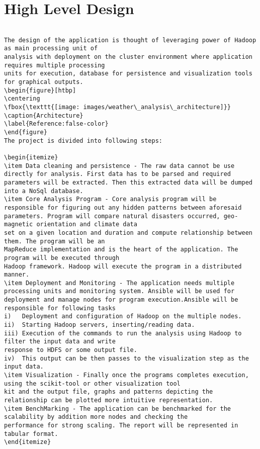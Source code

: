 \documentclass[9pt,twocolumn,twoside]{../../styles/osajnl}
\begin{document}
\section{High Level Design}

\begin{verbatim}

The design of the application is thought of leveraging power of Hadoop as main processing unit of
analysis with deployment on the cluster environment where application requires multiple processing
units for execution, database for persistence and visualization tools for graphical outputs.
\begin{figure}[htbp]
\centering
\fbox{\texttt{[image: images/weather\_analysis\_architecture]}}
\caption{Architecture}
\label{Reference:false-color}
\end{figure}
The project is divided into following steps:

\begin{itemize}
\item Data cleaning and persistence - The raw data cannot be use directly for analysis. First data has to be parsed and required parameters will be extracted. Then this extracted data will be dumped into a NoSql database.
\item Core Analysis Program - Core analysis program will be responsible for figuring out any hidden patterns between aforesaid parameters. Program will compare natural disasters occurred, geo-magnetic orientation and climate data
set on a given location and duration and compute relationship between them. The program will be an
MapReduce implementation and is the heart of the application. The program will be executed through
Hadoop framework. Hadoop will execute the program in a distributed manner.
\item Deployment and Monitoring - The application needs multiple processing units and monitoring system. Ansible will be used for deployment and manage nodes for program execution.Ansible will be responsible for following tasks
i)   Deployment and configuration of Hadoop on the multiple nodes.
ii)  Starting Hadoop servers, inserting/reading data.
iii) Execution of the commands to run the analysis using Hadoop to filter the input data and write
response to HDFS or some output file.
iv)  This output can be then passes to the visualization step as the input data.
\item Visualization - Finally once the programs completes execution, using the scikit-tool or other visualization tool
kit and the output file, graphs and patterns depicting the relationship can be plotted more intuitive representation.
\item BenchMarking - The application can be benchmarked for the scalability by addition more nodes and checking the
performance for strong scaling. The report will be represented in tabular format.
\end{itemize}





\end{verbatim}
\end{document}
